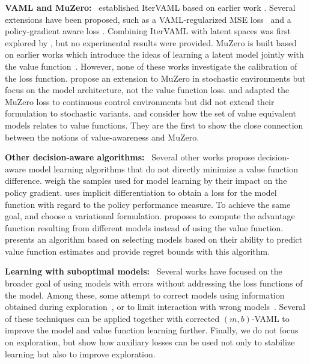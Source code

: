 \textbf{VAML and MuZero:}~ \textcite{itervaml} established IterVAML based on earlier work \parencite{vaml}.
Several extensions have been proposed, such as a VAML-regularized MSE loss~\parencite{voelcker2022value} and a policy-gradient aware loss \parencite{abachi2020policy}.
Combining IterVAML with latent spaces was first explored by \textcite{abachi2022viper}, but no experimental results were provided.
MuZero \parencite{schrittwieser2020mastering,ye2021mastering} is built based on earlier works which introduce the ideas of learning a latent model jointly with the value function~\parencite{silver2017predictron,oh2017value}.
However, none of these works investigate the calibration of the loss function.
\textcite{antonoglou2022planning} propose an extension to MuZero in stochastic environments but focus on the model architecture, not the value function loss.
\textcite{hansen2022temporal} and \textcite{hansen2024tdmpc} adapted the MuZero loss to continuous control environments but did not extend their formulation to stochastic variants.
\textcite{grimm2020value} and \textcite{grimm2021proper} consider how the set of value equivalent models relates to value functions. 
They are the first to show the close connection between the notions of value-awareness and MuZero.

\textbf{Other decision-aware algorithms:}~ Several other works propose decision-aware model learning algorithms that do not directly minimize a value function difference.
\textcite{doro2020gradient} weigh the samples used for model learning by their impact on the policy gradient.
\textcite{nikishin2021control} uses implicit differentiation to obtain a loss for the model function with regard to the policy performance measure. 
To achieve the same goal, \textcite{eysenbach2022mismatched} and \textcite{ghugare2023simplifying} choose a variational formulation.
\textcite{modhe2021model} proposes to compute the advantage function resulting from different models instead of using the value function.
\textcite{ayoub2020model} presents an algorithm based on selecting models based on their ability to predict value function estimates and provide regret bounds with this algorithm.

\textbf{Learning with suboptimal models:}~ Several works have focused on the broader goal of using models with errors without addressing the loss functions of the model.
Among these, some attempt to correct models using information obtained during exploration~\parencite{joseph2013reinforcement,talvitie2017self,modi2020sample,rakhsha2022operator,rakhsha2024maximum}, or to limit interaction with wrong models~\parencite{buckman2018sample,mbpo,pmlr-v119-abbas20a}.
Several of these techniques can be applied together with corrected $(m,b)$-VAML to improve the model and value function learning further.
Finally, we do not focus on exploration, but \textcite{guo2022byolexplore} show how auxiliary losses can be used not only to stabilize learning but also to improve exploration.

